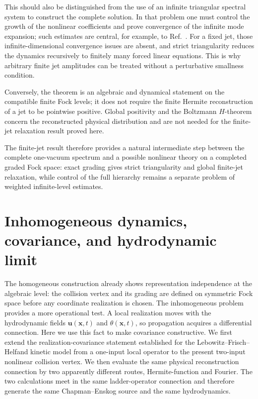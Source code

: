 \documentclass[11pt,oneside]{article}
\numberwithin{equation}{section}
\theoremstyle{definition}
\begin{document}
This should also be distinguished from the use of an infinite triangular
spectral system to construct the complete solution.  In that problem one
must control the growth of the nonlinear coefficients and prove convergence
of the infinite mode expansion; such estimates are central, for example,
to Ref.~\cite{GlangetasLiXu2016Triangular}.  For a fixed jet, those
infinite-dimensional convergence issues are absent, and strict
triangularity reduces the dynamics recursively to finitely many forced
linear equations.  This is why arbitrary finite jet amplitudes can be
treated without a perturbative smallness condition.

Conversely, the theorem is an algebraic and dynamical statement on the compatible finite Fock levels; it does not require the finite Hermite reconstruction of a jet to be pointwise positive.  Global positivity and the Boltzmann $H$-theorem concern the reconstructed physical distribution and are not needed for the finite-jet relaxation result proved here.

The finite-jet result therefore provides a natural intermediate step between the complete one-vacuum spectrum and a possible nonlinear theory on a completed graded Fock space: exact grading gives strict triangularity and global finite-jet relaxation, while control of the full hierarchy remains a separate problem of weighted infinite-level estimates.


\section{Inhomogeneous dynamics, covariance, and hydrodynamic limit}
\label{sec:maxwell_inhomogeneous}
\label{sec:maxwell_inhomogeneous_hydro}

The homogeneous construction already shows representation independence at the algebraic level: the collision vertex and its grading are defined on symmetric Fock space before any coordinate realization is chosen.  The inhomogeneous problem provides a more operational test.  A local realization moves with the hydrodynamic fields $\bm u(\bm x,t)$ and $\theta(\bm x,t)$, so propagation acquires a differential connection.  Here we use this fact to make covariance constructive.  We first extend the realization-covariance statement established for the Lebowitz--Frisch--Helfand kinetic model \cite{Karlin2026LFHFock} from a one-input local operator to the present two-input nonlinear collision vertex.  We then evaluate the same physical reconstruction connection by two apparently different routes, Hermite-function and Fourier.  The two calculations meet in the same ladder-operator connection and therefore generate the same Chapman--Enskog source and the same hydrodynamics.
\end{document}

